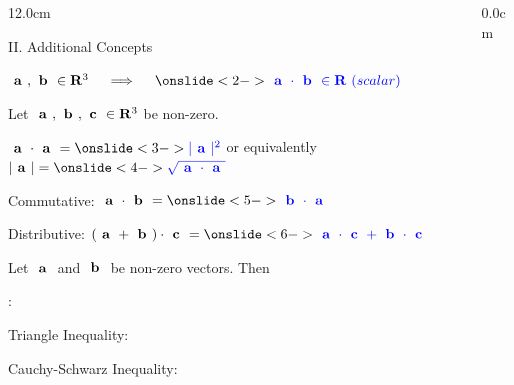 \begin{frame}
\begin{columns}
\begin{column}{12.0cm}

{II. Additional Concepts}

\vspace{0.2cm}

\scriptsize

\NOTE

\vspace{0.1cm}

\OBUL $\VA,\VB \in \RE^3 \quad \implies \quad \ON<2->{\B{\VA \cdot \VB \in \RE \,\, (scalar)}}$ \\

\vspace{0.7cm}

\PROP Let $\textbf{ a }, \textbf{ b }, \textbf{ c } \in \mathbf{R}^3$ be non-zero.

\vspace{0.2cm}

\OBUL $\VA \cdot \VA = \ON<3->{\B{|\VA|^2}}$ \quad or equivalently \quad $|\VA| = \ON<4->{\B{\sqrt{\VA \cdot \VA}}}$

\vspace{0.2cm}

\OBUL Commutative: $\VA \cdot \VB = \ON<5->{\B{\VB \cdot \VA}}$

\vspace{0.2cm}

\OBUL Distributive: $(\VA + \VB) \cdot \VC = \ON<6->{\B{\VA \cdot \VC + \VB \cdot \VC}}$

\vspace{0.7cm}

\THM Let $\textbf{ a }$ and $\textbf{ b }$ be non-zero vectors.  Then
\begin{center}
\end{center}

\vspace{0.2cm}

:	

\vspace{0.2cm}

\OBUL Triangle Inequality: \quad {}

\vspace{0.2cm}

\OBUL Cauchy-Schwarz Inequality: \quad {}

\vspace{0.7cm}

\end{column}
\begin{column}{0.0cm}\end{column}
\end{columns}
\end{frame}

